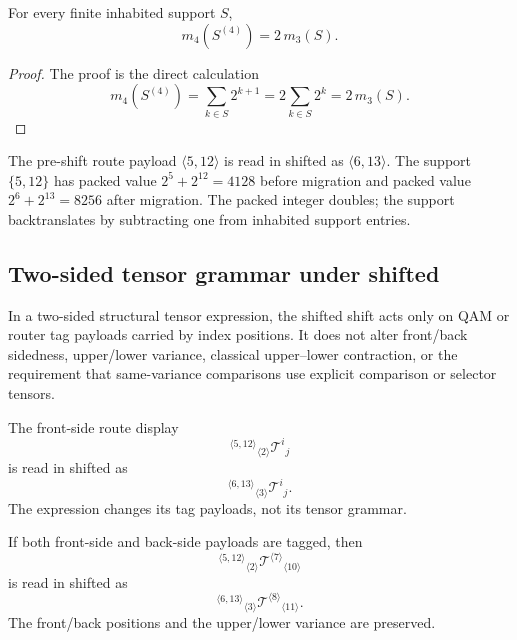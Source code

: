 \begin{lemma}
\label{lem:v400-r01-shifted-packed-mask-doubling}
For every finite inhabited support $S$,
\[
 m_4(S^{(4)})=2\,m_3(S).
\]
\end{lemma}

\begin{proof}
The proof is the direct calculation
\[
 m_4(S^{(4)})
 =
 \sum_{k\in S}2^{k+1}
 =
 2\sum_{k\in S}2^k
 =
 2\,m_3(S).
\]
\end{proof}

\begin{remark}
\label{rem:v400-r01-example-route-and-mask}
The pre-shift route payload $\langle 5,12\rangle$ is read in shifted as
$\langle 6,13\rangle$. The support $\{5,12\}$ has packed value
$2^5+2^{12}=4128$ before migration and packed value
$2^6+2^{13}=8256$ after migration. The packed integer doubles; the support
backtranslates by subtracting one from inhabited support entries.
\end{remark}

\subsection{Two-sided tensor grammar under shifted}
\label{subsec:v400-r01-two-sided-tensor-grammar-under-shifted}

\begin{definition}
\label{def:v400-r01-shifted-tensor-payload-migration}
In a two-sided structural tensor expression, the shifted shift acts only on QAM or
router tag payloads carried by index positions. It does not alter front/back
sidedness, upper/lower variance, classical upper--lower contraction, or the
requirement that same-variance comparisons use explicit comparison or selector
tensors.
\end{definition}

\begin{remark}
\label{rem:v400-r01-example-front-side-migration}
The front-side route display
\[
 {}^{\langle 5,12\rangle}{}_{\langle 2\rangle}\mathcal T^{i}{}_{j}
\]
is read in shifted as
\[
 {}^{\langle 6,13\rangle}{}_{\langle 3\rangle}\mathcal T^{i}{}_{j}.
\]
The expression changes its tag payloads, not its tensor grammar.
\end{remark}

\begin{remark}
\label{rem:v400-r01-example-full-payload-migration}
If both front-side and back-side payloads are tagged, then
\[
 {}^{\langle 5,12\rangle}{}_{\langle 2\rangle}
 \mathcal T^{\langle 7\rangle}{}_{\langle 10\rangle}
\]
is read in shifted as
\[
 {}^{\langle 6,13\rangle}{}_{\langle 3\rangle}
 \mathcal T^{\langle 8\rangle}{}_{\langle 11\rangle}.
\]
The front/back positions and the upper/lower variance are preserved.
\end{remark}


